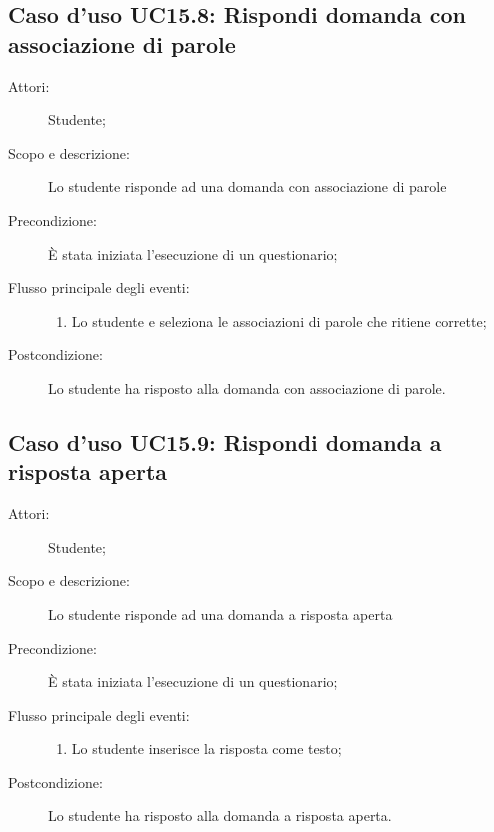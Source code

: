 \subsection{Caso d'uso UC15.8: Rispondi domanda con associazione di parole}\begin{description}
\item[Attori:] Studente;
\item[Scopo e descrizione:] Lo studente risponde ad una domanda con associazione di parole
      \item[Precondizione:] È stata iniziata l'esecuzione di un questionario;

        \item[Flusso principale degli eventi:] \begin{enumerate}
          \item Lo studente e seleziona le associazioni di parole che ritiene corrette;

      \end{enumerate}
    \item[Postcondizione:] Lo studente ha risposto alla domanda con associazione di parole.
  \end{description}
\hypertarget{UC15.9}{}
\subsection{Caso d'uso UC15.9: Rispondi domanda a risposta aperta}\begin{description}
\item[Attori:] Studente;
\item[Scopo e descrizione:] Lo studente risponde ad una domanda a risposta aperta
      \item[Precondizione:] È stata iniziata l'esecuzione di un questionario;

        \item[Flusso principale degli eventi:] \begin{enumerate}
          \item Lo studente inserisce la risposta come testo;

      \end{enumerate}
    \item[Postcondizione:] Lo studente ha risposto alla domanda a risposta aperta.
  \end{description}
\hypertarget{UC15.10}{}
